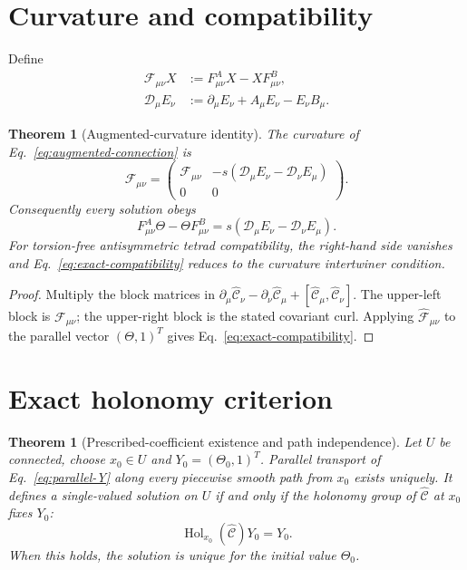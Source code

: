 \documentclass[12pt,a4paper]{article}
\newtheorem{theorem}[definition]{Theorem}
\theoremstyle{remark}\newtheorem{remark}[definition]{Remark}
\begin{document}
\section{Curvature and compatibility}
Define
\begin{align}
 \mathcal F_{\mu\nu}X
 &:=F^A_{\mu\nu}X-XF^B_{\mu\nu},\\
 \mathcal D_\mu E_\nu
 &:=\partial_\mu E_\nu+A_\mu E_\nu-E_\nu B_\mu.
\end{align}

\begin{theorem}[Augmented-curvature identity]
The curvature of Eq.~\eqref{eq:augmented-connection} is
\begin{equation}
 \boxed{
 \widehat{\mathcal F}_{\mu\nu}=
 \begin{pmatrix}
  \mathcal F_{\mu\nu} &
  -s(\mathcal D_\mu E_\nu-\mathcal D_\nu E_\mu)\\
  0&0
 \end{pmatrix}.}
 \label{eq:augmented-curvature}
\end{equation}
Consequently every solution obeys
\begin{equation}
 \boxed{
 F^A_{\mu\nu}\Theta-\Theta F^B_{\mu\nu}
 =s(\mathcal D_\mu E_\nu-\mathcal D_\nu E_\mu).}
 \label{eq:exact-compatibility}
\end{equation}
For torsion-free antisymmetric tetrad compatibility, the right-hand side
vanishes and Eq.~\eqref{eq:exact-compatibility} reduces to the curvature
intertwiner condition.
\end{theorem}

\begin{proof}
Multiply the block matrices in
$\partial_\mu\widehat{\mathcal C}_\nu-
\partial_\nu\widehat{\mathcal C}_\mu+
[\widehat{\mathcal C}_\mu,\widehat{\mathcal C}_\nu]$.  The upper-left block is
$\mathcal F_{\mu\nu}$; the upper-right block is the stated covariant curl.
Applying $\widehat{\mathcal F}_{\mu\nu}$ to the parallel vector
$(\Theta,1)^T$ gives Eq.~\eqref{eq:exact-compatibility}.
\end{proof}

\section{Exact holonomy criterion}
\begin{theorem}[Prescribed-coefficient existence and path independence]
Let $U$ be connected, choose $x_0\in U$ and $Y_0=(\Theta_0,1)^T$.  Parallel
transport of Eq.~\eqref{eq:parallel-Y} along every piecewise smooth path from
$x_0$ exists uniquely.  It defines a single-valued solution on $U$ if and only
if the holonomy group of $\widehat{\mathcal C}$ at $x_0$ fixes $Y_0$:
\begin{equation}
 \operatorname{Hol}_{x_0}(\widehat{\mathcal C})Y_0=Y_0.
 \label{eq:holonomy-criterion}
\end{equation}
When this holds, the solution is unique for the initial value $\Theta_0$.
\end{theorem}
\end{document}
